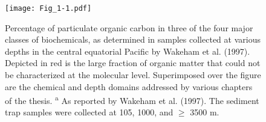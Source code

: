 \begin{figure}[t]
\centering
\texttt{[image: Fig\_1-1.pdf]}
\caption[Concept of the thesis in relation to the relative proportions of biochemicals in organic matter at different depths in the ocean.]{Percentage of particulate organic carbon in three of the four major classes of biochemicals, as determined in samples collected at various depths in the central equatorial Pacific by Wakeham et al. (1997). Depicted in red is the large fraction of organic matter that could not be characterized at the molecular level. Superimposed over the figure are the chemical and depth domains addressed by various chapters of the thesis. \textsuperscript{a} As reported by Wakeham et al. (1997). The sediment trap samples were collected at 105, 1000, and $\geq$ 3500 m.}
\label{fig:c1n1}
\end{figure}


